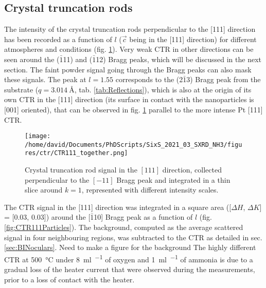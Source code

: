 \subsection{Crystal truncation rods}

The intensity of the crystal truncation rods perpendicular to the [111] direction has been recorded as a function of $l$ ($\vec{c}$ being in the [111] direction) for different atmospheres and conditions (fig. \ref{fig:2DCTR111Particles}).
Very weak CTR in other directions can be seen around the ($\bar{1}$11) and ($\bar{1}$12) Bragg peaks, which will be discussed in the next section.
The faint powder signal going through the Bragg peaks can also mask these signals.
The peak at $l=1.55$ corresponds to the (2$\bar{1}$3) Bragg peak from the  substrate ($q = \qty{3.014}{\angstrom}$, tab. \ref{tab:Reflections}), which is also at the origin of its own CTR in the [111] direction (its surface in contact with the nanoparticles is [001] oriented), that can be observed in fig. \ref{fig:2DCTR111Particles} parallel to the more intense Pt [111] CTR.

\begin{figure}[!htb]
    \centering
    \texttt{[image: /home/david/Documents/PhDScripts/SixS\_2021\_03\_SXRD\_NH3/figures/ctr/CTR111\_together.png]}
    \caption{
        Crystal truncation rod signal in the $[111]$ direction, collected perpendicular to the $[-11]$ Bragg peak and integrated in a thin slice around $k=1$, represented with different intensity scales.
    }
    \label{fig:2DCTR111Particles}
\end{figure}

The CTR signal in the [111] direction was integrated in a square area ([$\Delta H$, $\Delta K$] = [0.03, 0.03]) around the [$\bar{1}$10] Bragg peak as a function of $l$ (fig. \ref{fig:CTR111Particles}).
The background, computed as the average scattered signal in four neighbouring regions, was subtracted to the CTR as detailed in sec. \ref{sec:BINoculars}.
\textcolor{Important}{Need to make a figure for the background}
The highly different CTR at \qty{500}{\degreeCelsius} under \qty{8}{\ml\per\min} of oxygen and \qty{1}{\ml\per\min} of ammonia is due to a gradual loss of the heater current that were observed during the measurements, prior to a loss of contact with the heater.

